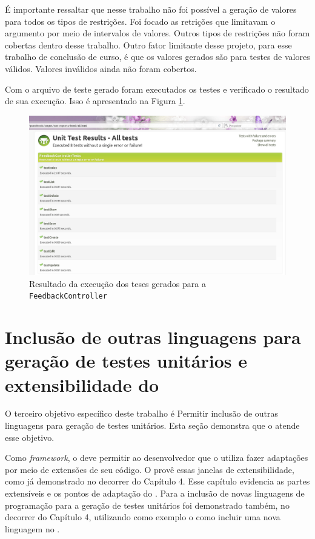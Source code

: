 É importante ressaltar que nesse trabalho não foi possível a geração de valores
para todos os tipos de restrições. Foi focado as retrições que limitavam o
argumento por meio de intervalos de valores. Outros tipos de restrições não foram
cobertas dentro desse trabalho. Outro fator limitante desse projeto, para esse
trabalho de conclusão de curso, é que os valores gerados são para testes de
valores válidos. Valores inválidos ainda não foram cobertos.

Com o arquivo de teste gerado foram executados os testes e verificado o resultado
de sua execução. Isso é apresentado na Figura \ref{result-test-controller-feedback}.

\begin{figure}[h]
  \centering
    \includegraphics[width=\textwidth]{figuras/result-test-controller-feedback.png}
    \caption{Resultado da execução dos teses gerados para a \lstinline|FeedbackController|}
    \label{result-test-controller-feedback}
\end{figure}
\FloatBarrier

\section{Inclusão de outras linguagens para geração de testes unitários e extensibilidade do \framework}
O terceiro objetivo específico deste trabalho é \textsf{Permitir inclusão de
outras linguagens para geração de testes unitários}. Esta seção demonstra que
o \scarefault atende esse objetivo.

Como \textit{framework}, o \scarefault deve permitir ao desenvolvedor que o utiliza
fazer adaptações por meio de extensões de seu código. O \scarefault provê
essas janelas de extensibilidade, como já demonstrado no decorrer do
Capítulo 4. Esse capítulo evidencia as partes extensíveis e os pontos de
adaptação do \framework. Para a inclusão de novas linguagens de programação
para a geração de testes unitários foi demonstrado também, no decorrer do
Capítulo 4, utilizando como exemplo o \grails como incluir uma nova linguagem
no \scarefault.

